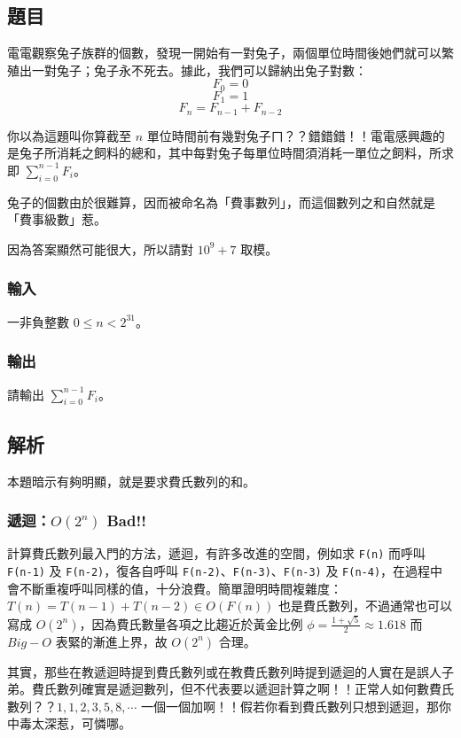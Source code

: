 \documentclass[a4paper,10pt]{article}
\begin{document}
\subsection{題目}

電電觀察兔子族群的個數，發現一開始有一對兔子，兩個單位時間後她們就可以繁殖出一對兔子；兔子永不死去。據此，我們可以歸納出兔子對數：
$$ F_0 = 0 $$
$$ F_1 = 1 $$
$$ F_n = F_{n-1} + F_{n-2} $$

你以為這題叫你算截至 $n$ 單位時間前有幾對兔子ㄇ？？錯錯錯！！電電感興趣的是兔子所消耗之飼料的總和，其中每對兔子每單位時間須消耗一單位之飼料，所求即 $\sum_{i=0}^{n-1}{F_i}$。

兔子的個數由於很難算，因而被命名為「費事數列」，而這個數列之和自然就是「費事級數」惹。

因為答案顯然可能很大，所以請對 $10^9+7$ 取模。

\subsubsection{輸入}

一非負整數 $0 \leq n < 2^{31}$。

\subsubsection{輸出}

請輸出 $\displaystyle\sum_{i=0}^{n-1}{F_i}$。

\subsection{解析}

本題暗示有夠明顯，就是要求費氏數列的和。

\subsubsection{遞迴：$O(2^n)$ Bad!!}

計算費氏數列最入門的方法，遞迴，有許多改進的空間，例如求 \texttt{F(n)} 而呼叫 \texttt{F(n-1)} 及 \texttt{F(n-2)}，復各自呼叫 \texttt{F(n-2)}、\texttt{F(n-3)}、\texttt{F(n-3)} 及 \texttt{F(n-4)}，在過程中會不斷重複呼叫同樣的值，十分浪費。簡單證明時間複雜度：$T(n) = T(n-1) + T(n-2) \in O(F(n))$ 也是費氏數列，不過通常也可以寫成 $O(2^n)$，因為費氏數量各項之比趨近於黃金比例 $\phi = \frac{1+\sqrt{5}}{2} \approx 1.618$ 而 $Big-O$ 表緊的漸進上界，故 $O(2^n)$ 合理。

其實，那些在教遞迴時提到費氏數列或在教費氏數列時提到遞迴的人實在是誤人子弟。費氏數列確實是遞迴數列，但不代表要以遞迴計算之啊！！正常人如何數費氏數列？？$1, 1, 2, 3, 5, 8, \cdots$ 一個一個加啊！！假若你看到費氏數列只想到遞迴，那你中毒太深惹，可憐哪。
\end{document}
